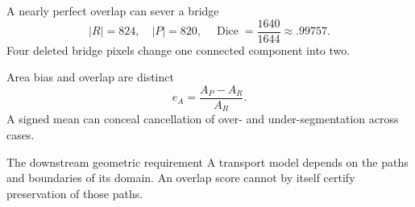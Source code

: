 \documentclass[aspectratio=169,11pt]{beamer}
\newcommand{\notestarget}{notes.pdf}\newcommand{\noteslabel}{Notes}
\begin{document}
\begin{frame}[t,fragile,label=slide-a-nearly-perfect-overlap-can-sever-a-bridge]{A nearly perfect overlap can sever a bridge}
\[|R|=824,\quad|P|=820,\quad\operatorname{Dice}=\frac{1640}{1644}\approx.99757.\]\pause{} Four deleted bridge pixels change one connected component into two.
\end{frame}
\renewcommand{\notestarget}{notes.pdf\#note-the-geometric-consequence-of-a-segmentation-error}
\begin{frame}[t,fragile,label=slide-area-bias-and-overlap-are-distinct]{Area bias and overlap are distinct}
\[e_A=\frac{A_P-A_R}{A_R}.\]\pause{} A signed mean can conceal cancellation of over- and under-segmentation across cases.
\end{frame}
\renewcommand{\notestarget}{notes.pdf\#note-the-geometric-consequence-of-a-segmentation-error}
\begin{frame}[t,fragile,label=slide-the-downstream-geometric-requirement]{The downstream geometric requirement}
A transport model depends on the paths and boundaries of its domain.\pause{} An overlap score cannot by itself certify preservation of those paths.
\end{frame}
\end{document}
